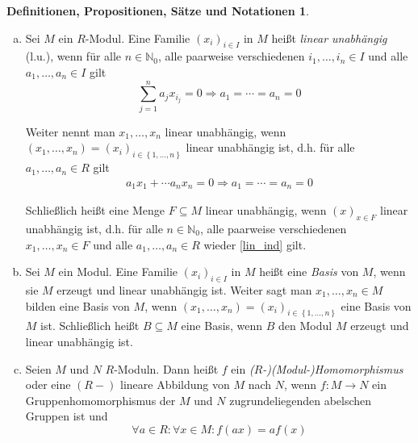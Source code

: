 \documentclass[
twoside=semi,
fontsize=12,
DIV=12, 
cleardoublepage=current,
leqno,
headings=optiontoheadandtoc, 
toc=idx
]{scrbook}
\newcommand{\N}{\mathbb{N}}
\newcommand{\set}[1]{\left\{ #1 \right\}}
\theoremstyle{definition}
\newtheorem{def-prop-satz-not}[definition]{Definitionen, Propositionen, S\"atze und Notationen}
\begin{document}
\begin{def-prop-satz-not}
\begin{enumerate}[(a)]
			Man nennt ihn den von den $x_i$ ($i \in I$) (oder $\set{x_i|i \in I}$) erzeugten Untermodul von $M$ (oder lineare H\"ulle der Span von $\set{x_i| i \in I}$). 
			
			Man nennt $M$ \emph{zyklisch}, wenn $M$ von einem Element erzeugt wird, d.h. es ein $x \in M$ gibt mit $M = Rx$. Man nennt $M$ endlich erzeugt (e.e.), wenn $M$ von endlich vielen Elementen
			erzeugt wird, d.h. es ein $n \in \N_0$ und $x_1, \dots, x_n \in M$ gibt mit 
			\[M = Rx_1 + \cdots + Rx_n := \sum_{i=1}^{n} Rx_i := \sum_{i \in \set{1, \dots, n}} Rx_i\] 
			
			\item Sei $M$ ein $R$-Modul. Eine Familie $(x_i)_{i\in I}$ in $M$ hei\ss t \emph{linear unabh\"angig} (l.u.), wenn f\"ur alle $n\in \N_0$, alle paarweise verschiedenen $i_1, \dots, i_n \in I$ und alle $a_1, \dots, a_n \in I$ gilt 
			\[\sum_{j=1}^{n} a_jx_{i_j} = 0 \Rightarrow a_1 = \cdots = a_n = 0\]
			
			Weiter nennt man $x_1, \dots, x_n$ linear unabh\"angig, wenn $(x_1, \dots, x_n) = (x_i)_{i \in \set{1, \dots, n}}$ linear unabh\"angig ist, d.h. f\"ur alle $a_1, \dots, a_n \in R$ gilt 
			\begin{align}
				a_1x_1 + \cdots a_nx_n = 0 \Rightarrow a_1 = \cdots = a_n = 0 \label{lin_ind}
			\end{align}
			
			Schlie\ss lich hei\ss t eine Menge $F\subseteq M$ linear unabh\"angig, wenn $(x)_{x \in F}$ linear unabh\"angig ist, d.h. f\"ur alle $n\in \N_0$, alle paarweise verschiedenen $x_1, \dots, x_n \in F$ und alle $a_1, \dots, a_n \in R$ wieder \ref{lin_ind} gilt.
			
			\item Sei $M$ ein Modul. Eine Familie $(x_i)_{i \in I}$ in $M$ hei\ss t eine \emph{Basis} von $M$, wenn sie $M$ erzeugt und linear unabh\"angig ist. Weiter
			sagt man $x_1, \dots, x_n \in M$ bilden eine Basis von $M$, wenn $(x_1, \dots, x_n) = (x_i)_{i \in \set{1, \dots, n}}$ eine Basis von $M$ ist. Schlie\ss lich hei\ss t $B \subseteq M$ eine Basis, wenn $B$ den Modul $M$ erzeugt und linear unabh\"angig ist.
			
			\item Seien $M$ und $N$ $R$-Moduln. Dann hei\ss t $f$ ein \emph{($R$-)(Modul-)Homomorphismus} oder eine $(R-)$ lineare Abbildung von $M$ nach $N$, wenn $f:M\to N$ ein Gruppenhomomorphismus der $M$ und $N$ zugrundeliegenden abelschen Gruppen ist und 
			\[\forall a \in R: \forall x \in M: f(ax) = af(x) \]
			

\end{enumerate}
\end{def-prop-satz-not}
\end{document}
